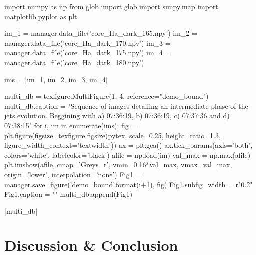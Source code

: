 \documentclass{emulateapj}
\begin{document}
\begin{pycode}
import numpy as np
from glob import glob
import sunpy.map
import matplotlib.pyplot as plt

im_1 = manager.data_file('core_Ha_dark_165.npy')
im_2 = manager.data_file('core_Ha_dark_170.npy')
im_3 = manager.data_file('core_Ha_dark_175.npy')
im_4 = manager.data_file('core_Ha_dark_180.npy')

ims = [im_1, im_2, im_3, im_4]

multi_db = texfigure.MultiFigure(1, 4, reference="demo_bound")
multi_db.caption = "Sequence of images detailing an intermediate phase of the jets evolution. Beggining with a) 07:36:19, b) 07:36:19, c) 07:37:36 and d) 07:38:15"
for i, im in enumerate(ims):
	fig = plt.figure(figsize=texfigure.figsize(pytex, scale=0.25, height_ratio=1.3, figure_width_context='textwidth'))
	ax = plt.gca()
	ax.tick_params(axis='both', colors='white', labelcolor='black')
	afile = np.load(im)
	val_max = np.max(afile)
	plt.imshow(afile, cmap='Greys_r', vmin=0.16*val_max, vmax=val_max, origin='lower', interpolation='none')
	Fig1 = manager.save_figure('demo_bound{}'.format(i+1), fig)
	Fig1.subfig_width = r"0.2\textwidth"
	Fig1.caption = ""
	multi_db.append(Fig1)

\end{pycode}





|multi_db|


\section{Discussion \& Conclusion}





\end{document}
